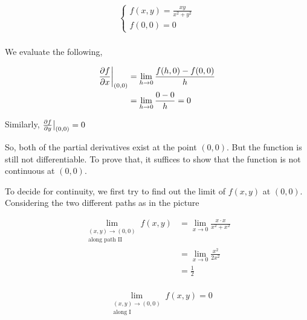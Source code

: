 \begin{align*}
    \begin{cases}
        f(x,y) = \frac{xy}{x^2 + y^2} \\
        f(0,0) = 0
    \end{cases} \\
\end{align*}

We evaluate the following,

\begin{align*}
    \frac{\partial f}{\partial x} \bigg|_{(0,0)} &= \displaystyle\lim_{h \to 0} \frac{f(h,0) - f(0,0)}{h} \\
    &= \displaystyle\lim_{h \to 0} \frac{0-0}{h} = 0 \\
\end{align*}

Similarly, $ \frac{\partial f}{\partial y} \big|_{(0,0)} = 0$

So, both of the partial derivatives exist at the point $ (0,0)$. But the function is still not differentiable. To prove that, it suffices to show that the function is not continuous at $ (0,0)$.

To decide for continuity, we first try to find out the limit of $ f(x,y)$ at $ (0,0)$. Considering the two different paths as in the picture

\begin{center}
\end{center}

\begin{align*}
    \displaystyle\lim_{\substack{(x,y) \to (0,0) \\ \text{along path II}}} f(x,y) &= \displaystyle\lim_{x \to 0} \frac{x \cdot x}{x^2 + x^2} \\
    &= \displaystyle\lim_{x \to 0} \frac{x^2}{2x^2} \\
    &= \frac{1}{2} \\
\end{align*}

\begin{align*}
    & \displaystyle\lim_{\substack{(x,y) \to (0,0) \\ \text{along I}}} f(x,y) = 0 \\
\end{align*}

